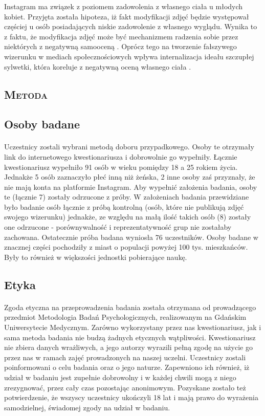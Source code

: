 \documentclass[12pt,a4paper,final,oneside,onecolumn,titlepage]{article}
\begin{document}
Instagram ma związek z poziomem zadowolenia z własnego ciała u młodych kobiet. Przyjęta została hipoteza, iż fakt modyfikacji zdjęć będzie występował częściej u osób posiadających niskie zadowolenie z własnego wyglądu. Wynika to z faktu, że modyfikacja zdjęć może być mechanizmem radzenia sobie przez niektórych z negatywną samooceną \citep{kleemans_picture_2018,lyu_travel_2016}. Oprócz tego na tworzenie fałszywego wizerunku w mediach społecznościowych wpływa internalizacja ideału szczupłej sylwetki, która koreluje z negatywną oceną własnego ciała \citep{blowers_relationship_2003}.
\begin{center}
\section*{\large{\textbf{\textsc{Metoda}}}}
\end{center}
\subsection*{\normalsize{\textbf{Osoby badane}}}
\paragraph{}
Uczestnicy zostali wybrani metodą doboru przypadkowego. Osoby te otrzymały link do internetowego kwestionariusza i dobrowolnie go wypełniły. Łącznie kwestionariusz wypełniło 91 osób w wieku pomiędzy 18 a 25 rokiem życia. Jednakże 5 osób zaznaczyło płeć inną niż żeńska, 2 inne osoby zaś przyznały, że nie mają konta na platformie Instagram. Aby wypełnić założenia badania, osoby te (łącznie 7) zostały odrzucone z próby. W założeniach badania przewidziane było badanie osób łącznie z próbą kontrolną (osób, które nie publikują zdjęć swojego wizerunku) jednakże, ze względu na małą ilość takich osób (8) zostały one odrzucone - porównywalność i reprezentatywność grup nie zostałaby zachowana. Ostatecznie próba badana wyniosła 76 uczestników. Osoby badane w znacznej części pochodziły z miast o populacji powyżej 100 tys. mieszkańców. Były to również w większości jednostki pobierające naukę.
\subsection*{\normalsize{\textbf{Etyka}}}
\paragraph{}
Zgoda etyczna na przeprowadzenia badania została otrzymana od prowadzącego przedmiot Metodologia Badań Psychologicznych, realizowanym na Gdańskim Uniwersytecie Medycznym. Zarówno wykorzystany przez nas kwestionariusz, jak i sama metoda badania nie budzą żadnych etycznych wątpliwości. Kwestionariusz nie zbiera danych wrażliwych, a jego autorzy wyrazili pełną zgodę na użycie go przez nas w ramach zajęć prowadzonych na naszej uczelni. Uczestnicy zostali poinformowani o celu badania oraz o jego naturze. Zapewniono ich również, iż udział w badaniu jest zupełnie dobrowolny i w każdej chwili mogą z niego zrezygnować, przez cały czas pozostając anonimowym. Pozyskane zostało też potwierdzenie, że wszyscy uczestnicy ukończyli 18 lat i mają prawo do wyrażenia samodzielnej, świadomej zgody na udział w badaniu. 
\end{document}
